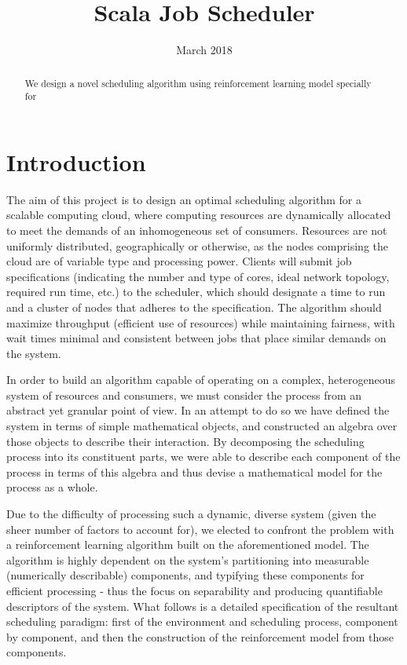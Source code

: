 \documentclass{article}
\title{Scala Job Scheduler}
\date{March 2018}
\theoremstyle{definition}
\theoremstyle{remark}
\begin{document}
	
	\maketitle
	
	\begin{abstract}
		We design a novel scheduling algorithm using reinforcement learning model specially for 
	\end{abstract}
	
	\newpage
	\tableofcontents
	
	\newpage
	


	\section*{Introduction}

	\indent
	
	The aim of this project is to design an optimal scheduling algorithm for a scalable computing cloud, where
 	computing resources are dynamically allocated to meet the demands of an inhomogeneous set of consumers. Resources
 	are not uniformly distributed, geographically or otherwise, as the nodes comprising the cloud are of variable type
 	and processing power. Clients will submit job specifications (indicating the number and type of cores, ideal
	network topology, required run time, etc.) to the scheduler, which should designate a time to run and a cluster of
	nodes that adheres to the specification. The algorithm should maximize throughput (efficient use of resources)
	while maintaining fairness, with wait times minimal and consistent between jobs that place similar demands on the
	system.
	
	In order to build an algorithm capable of operating on a complex, heterogeneous system of resources and consumers,
	we must consider the process from an abstract yet granular point of view. In an attempt to do so we have defined
	the system in terms of simple mathematical objects, and constructed an algebra over those objects to describe
	their interaction. By decomposing the scheduling process into its constituent parts, we were able to describe
	each component of the process in terms of this algebra and thus devise a mathematical model for the process as a
	whole. 
	
	Due to the difficulty of processing such a dynamic, diverse system (given the sheer number of factors to account
	for), we elected to confront the problem with a reinforcement learning algorithm built on the aforementioned model.
	The algorithm is highly dependent on the system's partitioning into measurable (numerically describable)
	components, and typifying these components for efficient processing - thus the focus on separability and producing
	quantifiable descriptors of the system. What follows is a detailed specification of the resultant scheduling
	paradigm: first of the environment and scheduling process, component by component, and then the construction of
	the reinforcement model from those components.
	
\end{document}
